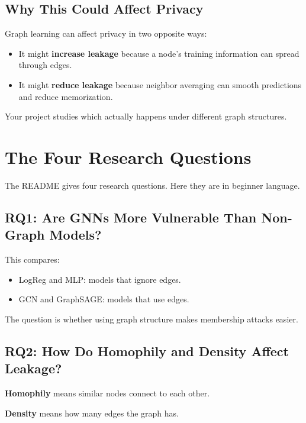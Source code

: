 \documentclass[11pt,a4paper]{article}
\begin{document}
\subsection{Why This Could Affect Privacy}

Graph learning can affect privacy in two opposite ways:

\begin{itemize}
  \item It might \textbf{increase leakage} because a node's training information can spread through edges.
  \item It might \textbf{reduce leakage} because neighbor averaging can smooth predictions and reduce memorization.
\end{itemize}

Your project studies which actually happens under different graph structures.

\section{The Four Research Questions}

The README gives four research questions. Here they are in beginner language.

\subsection{RQ1: Are GNNs More Vulnerable Than Non-Graph Models?}

This compares:
\begin{itemize}
  \item LogReg and MLP: models that ignore edges.
  \item GCN and GraphSAGE: models that use edges.
\end{itemize}

The question is whether using graph structure makes membership attacks easier.

\subsection{RQ2: How Do Homophily and Density Affect Leakage?}

\textbf{Homophily} means similar nodes connect to each other.

\textbf{Density} means how many edges the graph has.
\end{document}
